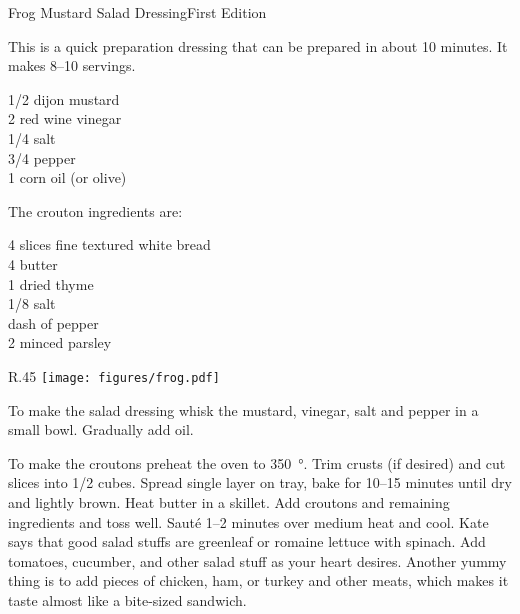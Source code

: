 \begin{entry}{Frog Mustard Salad Dressing}{First Edition}

\begin{open}
  This is a quick preparation dressing that can be prepared in about 10
  minutes.  It makes \numrange{8}{10} servings.
\end{open}
\begin{ingredients}
  \SI{1/2}{\cup} dijon mustard \\
  \SI{2}{\tblspoon} red wine vinegar \\
  \SI{1/4}{\teaspoon} salt \\
  \SI{3/4}{\teaspoon} pepper \\
  \SI{1}{\cup} corn oil (or olive)
\end{ingredients}
The crouton ingredients are:
\begin{ingredients}
  4 slices fine textured white bread \\
  \SI{4}{\tblspoon}  butter \\
  \SI{1}{\teaspoon} dried thyme \\
  \SI{1/8}{\teaspoon} salt \\
  dash of pepper \\
  \SI{2}{\teaspoon} minced parsley
\end{ingredients}
\begin{wrapfigure}{R}{.45\textwidth}
\centering\texttt{[image: figures/frog.pdf]}
\end{wrapfigure}
To make the salad dressing whisk the mustard, vinegar, salt and pepper in a
small bowl.  Gradually add oil.

To make the croutons preheat the oven to \SI{350}{\degree}.  Trim crusts (if
desired) and cut slices into \SI{1/2}{\inch} cubes.  Spread single layer on
tray, bake for \numrange{10}{15} minutes until dry and lightly brown.  Heat
butter in a skillet.  Add croutons and remaining ingredients and toss well.
Saut\'{e} \numrange{1}{2} minutes over medium heat and cool.  Kate says that
good salad stuffs are greenleaf or romaine lettuce with spinach.  Add tomatoes,
cucumber, and other salad stuff as your heart desires.  Another yummy thing is
to add pieces of chicken, ham, or turkey and other meats, which makes it taste
almost like a bite-sized sandwich.
\end{entry}

